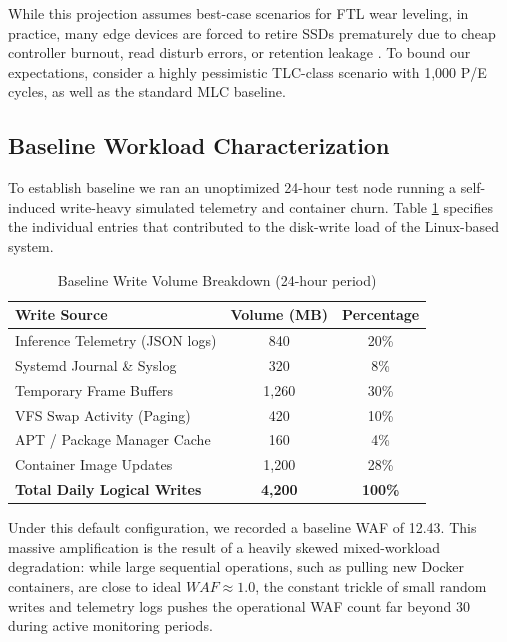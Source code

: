 \documentclass[conference]{IEEEtran}
\begin{document}
While this projection assumes best-case scenarios for FTL wear leveling, in practice, many edge devices are forced to retire SSDs prematurely due to cheap controller burnout, read disturb errors, or retention leakage \cite{b10}. To bound our expectations, consider a highly pessimistic TLC-class scenario with 1,000 P/E cycles, as well as the standard MLC baseline.

\subsection{Baseline Workload Characterization}
To establish baseline we ran an unoptimized 24-hour test node running a self-induced write-heavy simulated telemetry and container churn. Table \ref{tab:baseline} specifies the individual entries that contributed to the disk-write load of the Linux-based system.

\begin{table}[htbp]
\caption{Baseline Write Volume Breakdown (24-hour period)}
\begin{center}
\begin{tabular}{@{}lcc@{}}
\toprule
\textbf{Write Source} & \textbf{Volume (MB)} & \textbf{Percentage} \\
\midrule
Inference Telemetry (JSON logs) & 840 & 20\% \\
Systemd Journal \& Syslog & 320 & 8\% \\
Temporary Frame Buffers & 1,260 & 30\% \\
VFS Swap Activity (Paging) & 420 & 10\% \\
APT / Package Manager Cache & 160 & 4\% \\
Container Image Updates & 1,200 & 28\% \\
\bottomrule
\textbf{Total Daily Logical Writes} & \textbf{4,200} & \textbf{100\%} \\
\end{tabular}
\end{center}
\label{tab:baseline}
\end{table}

Under this default configuration, we recorded a baseline WAF of 12.43. This massive amplification is the result of a heavily skewed mixed-workload degradation: while large sequential operations, such as pulling new Docker containers, are close to ideal $WAF \approx 1.0$, the constant trickle of small random writes and telemetry logs pushes the operational WAF count far beyond 30 during active monitoring periods.

\end{document}
